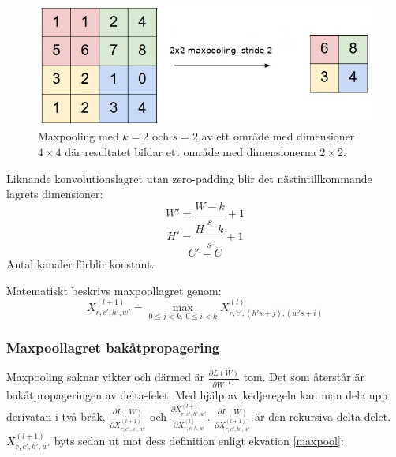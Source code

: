 \documentclass[a4paper,11pt,twoside]{article}
\newcommand*{\inpd}[2]{\ensuremath{\frac{\partial #1}{\partial #2}}}
\begin{document}
\begin{figure}[h]\label{figmaxpool}
	\centering
  		\includegraphics[scale=0.7]{maxpool.png}
  	\caption{Maxpooling med $k=2$ och $s=2$ av ett område med dimensioner $4 \times 4$ där resultatet bildar ett område med dimensionerna $2 \times 2$.}
\end{figure}

Liknande konvolutionslagret utan zero-padding blir det nästintillkommande lagrets dimensioner: \cite{cs231n} \cite{convmath} \cite{convarithmetic}
\begin{equation}
W' = \frac{W-k}{s}+1
\end{equation}
\begin{equation}
H' = \frac{H-k}{s}+1
\end{equation}
\begin{equation}
C' = C
\end{equation}
Antal kanaler förblir konstant. \cite{cs231n} \cite{convmath}

Matematiskt beskrivs maxpoollagret genom: \cite{cs231n} \cite{convmath}
\begin{equation}\label{maxpool}
X^{(l+1)}_{r,c',h',w'} = \underset{0 \leq j < k, \ 0 \leq i < k}{\max} X^{(l)}_{r,c',(h's+j),(w's+i)}
\end{equation}
\subsubsection{Maxpoollagret bakåtpropagering}
Maxpooling saknar vikter och därmed är $\inpd{L(W)}{W^{(l)}}$ tom. Det som återstår är bakåtpropageringen av delta-felet. Med hjälp av kedjeregeln kan man dela upp derivatan i två bråk, $\inpd{L(W)}{X^{(l+1)}_{r,c',h',w'}}$ och $\inpd{X^{(l+1)}_{r,c',h',w'}}{X^{(l)}_{r,c,h,w}}$. $\inpd{L(W)}{X^{(l+1)}_{r,c',h',w'}}$ är den rekursiva delta-delet. $X^{(l+1)}_{r,c',h',w'}$ byts sedan ut mot dess definition enligt ekvation \eqref{maxpool}: \cite{cs231n} \cite{convmath} \cite{webconv3}
\end{document}
